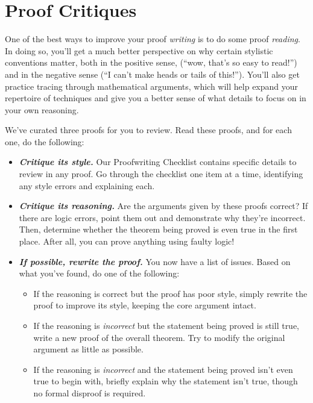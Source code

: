 \documentclass{article}
\renewcommand{\(}{\left(}
\renewcommand{\)}{\right)}
\theoremstyle{plain}
\theoremstyle{plain}
\theoremstyle{definition}
\begin{document}
\pagebreak

\section{Proof Critiques}

One of the best ways to improve your proof \textit{writing} is to do some proof \textit{reading}. In doing so, you'll get a much better perspective on why certain stylistic conventions matter, both in the positive sense, (``wow, that's so easy to read!'') and in the negative sense (``I can't make heads or tails of this!''). You'll also get practice tracing through mathematical arguments, which will help expand your repertoire of techniques and give you a better sense of what details to focus on in your own reasoning. 

We've curated three proofs for you to review. Read these proofs, and for each one, do the following: 
\begin{itemize}
    \item \textit{\textbf{Critique its style.}} Our Proofwriting Checklist contains specific details to review in any proof. Go through the checklist one item at a time, identifying any style errors and explaining each. 
    \item \textit{\textbf{Critique its reasoning.}} Are the arguments given by these proofs correct? If there are logic errors, point them out and demonstrate why they're incorrect. Then, determine whether the theorem being proved is even true in the first place. After all, you can prove anything using faulty logic!
    \item \textit{\textbf{If possible, rewrite the proof.}} You now have a list of issues. Based on what you've found, do one of the following:
    \begin{itemize}
        \item If the reasoning is correct but the proof has poor style, simply rewrite the proof to improve its style, keeping the core argument intact.
        \item If the reasoning is \textit{incorrect} but the statement being proved is still true, write a new proof of the overall theorem. Try to modify the original argument as little as possible.
        \item If the reasoning is \textit{incorrect} and the statement being proved isn't even true to begin with, briefly explain why the statement isn't true, though no formal disproof is required.
    \end{itemize}
\end{itemize}
\end{document}
